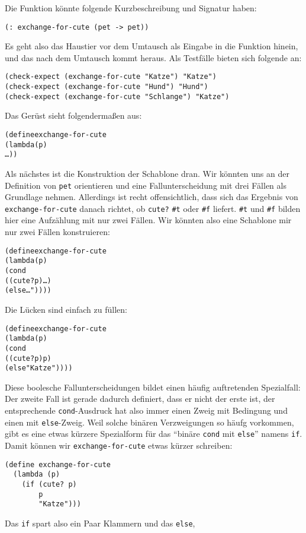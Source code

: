 Die Funktion könnte folgende Kurzbeschreibung und Signatur
haben:
%
\begin{verbatim}
(: exchange-for-cute (pet -> pet))
\end{verbatim}
%
Es geht also das Haustier vor dem Umtausch als Eingabe in die Funktion
hinein, und das nach dem Umtausch kommt heraus.  Als Testfälle bieten
sich folgende an:
%
\begin{verbatim}
(check-expect (exchange-for-cute "Katze") "Katze")
(check-expect (exchange-for-cute "Hund") "Hund")
(check-expect (exchange-for-cute "Schlange") "Katze")
\end{verbatim}
%
Das Gerüst sieht folgendermaßen aus:
%
\begin{alltt}
(define exchange-for-cute
  (lambda (p)
    \ldots))
\end{alltt}
%
Als nächstes ist die Konstruktion der Schablone dran.  Wir könnten uns
an der Definition von \texttt{pet} orientieren und eine
Fallunterscheidung mit drei Fällen als Grundlage nehmen.  Allerdings
ist recht offensichtlich, dass sich das Ergebnis von
\texttt{exchange-for-cute} danach richtet, ob \texttt{cute?} \verb|#t|
oder \verb|#f| liefert.   \verb|#t| und \verb|#f| bilden hier eine
Aufzählung mit nur zwei Fällen.  Wir könnten also eine Schablone mir
nur zwei Fällen konstruieren:
%
\begin{alltt}
(define exchange-for-cute
  (lambda (p)
    (cond
      ((cute? p) \ldots)
      (else \ldots"))))
\end{alltt}
%
Die Lücken sind einfach zu füllen:
%
\begin{alltt}
(define exchange-for-cute
  (lambda (p)
    (cond
      ((cute? p) p)
      (else "Katze"))))
\end{alltt}
%
Diese boolesche Fallunterscheidungen bildet einen häufig auftretenden
Spezialfall: Der zweite Fall ist gerade dadurch definiert, dass er
nicht der erste ist, der entsprechende \texttt{cond}-Ausdruck hat also
immer einen Zweig mit Bedingung und einen mit \texttt{else}-Zweig.
Weil solche binären Verzweigungen so häufg vorkommen, gibt es eine
etwas kürzere Spezialform für das "`binäre \texttt{cond} mit
\texttt{else}"' namens \texttt{if}.  Damit
können wir \texttt{exchange-for-cute} etwas kürzer schreiben:
%
\begin{verbatim}
(define exchange-for-cute
  (lambda (p)
    (if (cute? p)
        p
        "Katze")))
\end{verbatim}
%
Das \texttt{if} spart also ein Paar Klammern und das \texttt{else},
